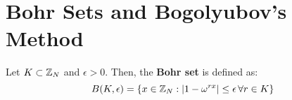 \documentclass[a4paper]{article}
\begin{document}
{\section{Bohr Sets and Bogolyubov's Method}
\begin{defi}
	Let $K\subset\mathbb{Z}_N$ and $\epsilon>0$. Then, the \textbf{Bohr set} is defined as:
	$$B(K,\epsilon)=\{x\in\mathbb{Z}_N : \left|1-\omega^{rx}\right|\leq\epsilon\,\forall r\in K\}$$
\end{defi}
%
%
%
%
%
%
%
}
\end{document}

